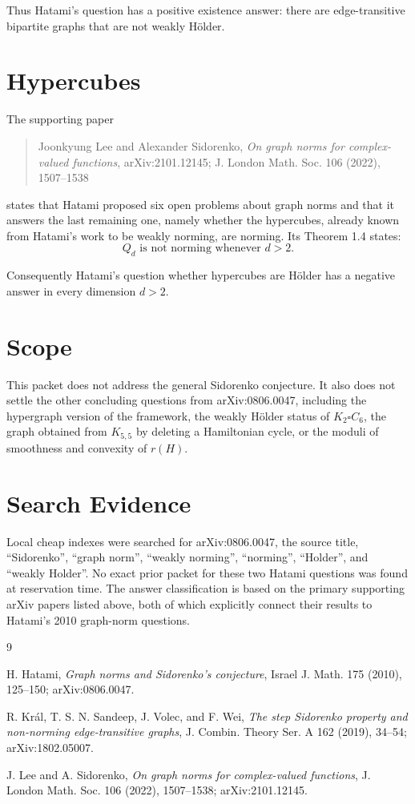 \documentclass[11pt]{article}
\newcommand{\Holder}{H\"older}
\begin{document}
Thus Hatami's question has a positive existence answer: there are
edge-transitive bipartite graphs that are not weakly \Holder.

\section*{Hypercubes}

The supporting paper
\begin{quote}
Joonkyung Lee and Alexander Sidorenko,
\emph{On graph norms for complex-valued functions}, arXiv:2101.12145;
J. London Math. Soc. 106 (2022), 1507--1538
\end{quote}
states that Hatami proposed six open problems about graph norms and that it
answers the last remaining one, namely whether the hypercubes, already known
from Hatami's work to be weakly norming, are norming. Its Theorem 1.4 states:
\[
  Q_d \text{ is not norming whenever } d>2.
\]

Consequently Hatami's question whether hypercubes are \Holder{} has a negative
answer in every dimension \(d>2\).

\section*{Scope}

This packet does not address the general Sidorenko conjecture. It also does
not settle the other concluding questions from arXiv:0806.0047, including the
hypergraph version of the framework, the weakly \Holder{} status of
\(K_2 \square C_6\), the graph obtained from \(K_{5,5}\) by deleting a
Hamiltonian cycle, or the moduli of smoothness and convexity of \(r(H)\).

\section*{Search Evidence}

Local cheap indexes were searched for arXiv:0806.0047, the source title,
``Sidorenko'', ``graph norm'', ``weakly norming'', ``norming'', ``Holder'', and
``weakly Holder''. No exact prior packet for these two Hatami questions was
found at reservation time. The answer classification is based on the primary
supporting arXiv papers listed above, both of which explicitly connect their
results to Hatami's 2010 graph-norm questions.

\begin{thebibliography}{9}

H. Hatami,
\emph{Graph norms and Sidorenko's conjecture},
Israel J. Math. 175 (2010), 125--150; arXiv:0806.0047.

R. Kr\'al, T. S. N. Sandeep, J. Volec, and F. Wei,
\emph{The step Sidorenko property and non-norming edge-transitive graphs},
J. Combin. Theory Ser. A 162 (2019), 34--54; arXiv:1802.05007.

J. Lee and A. Sidorenko,
\emph{On graph norms for complex-valued functions},
J. London Math. Soc. 106 (2022), 1507--1538; arXiv:2101.12145.

\end{thebibliography}
\end{document}
